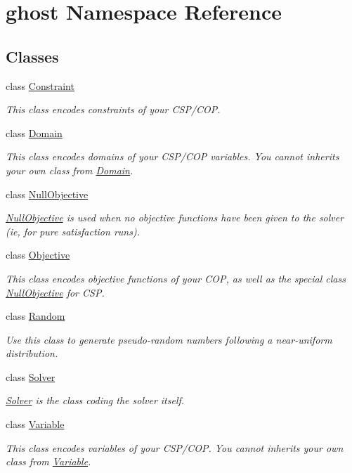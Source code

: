 \hypertarget{namespaceghost}{}\section{ghost Namespace Reference}
\label{namespaceghost}
\subsection*{Classes}
\begin{DoxyCompactItemize}
\item 
class \hyperlink{classghost_1_1Constraint}{Constraint}
\begin{DoxyCompactList}\small\item\em This class encodes constraints of your C\+S\+P/\+C\+OP. \end{DoxyCompactList}\item 
class \hyperlink{classghost_1_1Domain}{Domain}
\begin{DoxyCompactList}\small\item\em This class encodes domains of your C\+S\+P/\+C\+OP variables. You cannot inherits your own class from \hyperlink{classghost_1_1Domain}{Domain}. \end{DoxyCompactList}\item 
class \hyperlink{classghost_1_1NullObjective}{Null\+Objective}
\begin{DoxyCompactList}\small\item\em \hyperlink{classghost_1_1NullObjective}{Null\+Objective} is used when no objective functions have been given to the solver (ie, for pure satisfaction runs). \end{DoxyCompactList}\item 
class \hyperlink{classghost_1_1Objective}{Objective}
\begin{DoxyCompactList}\small\item\em This class encodes objective functions of your C\+OP, as well as the special class \hyperlink{classghost_1_1NullObjective}{Null\+Objective} for C\+SP. \end{DoxyCompactList}\item 
class \hyperlink{classghost_1_1Random}{Random}
\begin{DoxyCompactList}\small\item\em Use this class to generate pseudo-\/random numbers following a near-\/uniform distribution. \end{DoxyCompactList}\item 
class \hyperlink{classghost_1_1Solver}{Solver}
\begin{DoxyCompactList}\small\item\em \hyperlink{classghost_1_1Solver}{Solver} is the class coding the solver itself. \end{DoxyCompactList}\item 
class \hyperlink{classghost_1_1Variable}{Variable}
\begin{DoxyCompactList}\small\item\em This class encodes variables of your C\+S\+P/\+C\+OP. You cannot inherits your own class from \hyperlink{classghost_1_1Variable}{Variable}. \end{DoxyCompactList}\end{DoxyCompactItemize}
